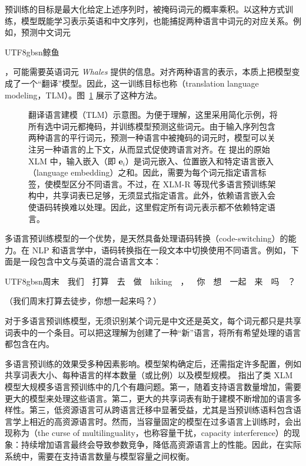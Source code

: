 \noindent 预训练的目标是最大化给定上述序列时，被掩码词元的概率乘积。以这种方式训练，模型既能学习表示英语和中文序列，也能捕捉两种语言中词元的对应关系。例如，预测中文词元\begin{CJK*}{UTF8}{gbsn}鲸鱼\end{CJK*}，可能需要英语词元 \textit{Whales} 提供的信息。对齐两种语言的表示，本质上把模型变成了一个“翻译”模型。因此，这一训练目标也称（translation language modeling，TLM）。图~\ref{fig:translation-language-modeling} 展示了这种方法。

\begin{figure}[!t]
\centering

\caption{翻译语言建模（TLM）示意图。为便于理解，这里采用简化示例，将所有选中词元都掩码，并训练模型预测这些词元。由于输入序列包含两种语言的平行词元，预测一种语言中被掩码的词元时，模型可以关注另一种语言的上下文，从而显式促使跨语言对齐。在 \citet{lample-conneau:2019cross} 提出的原始 XLM 中，输入嵌入（即 $\mathbf{e}_i$）是词元嵌入、位置嵌入和特定语言嵌入（language embedding）之和。因此，需要为每个词元指定语言标签，使模型区分不同语言。不过，在 XLM-R 等现代多语言预训练架构中，共享词表已足够，无须显式指定语言。此外，依赖语言嵌入会使语码转换难以处理。因此，这里假定所有词元表示都不依赖特定语言。}
\label{fig:translation-language-modeling}
\end{figure}

多语言预训练模型的一个优势，是天然具备处理语码转换（code-switching）的能力。在 NLP 和语言学中，语码转换指在一段文本中切换使用不同语言。例如，下面是一段包含中文与英语的混合语言文本：

\vspace{0.5em}
\begin{center}
\begin{CJK*}{UTF8}{gbsn}周末\ \ 我们\ \ 打算\ \ 去\ \ 做\ \ hiking\ \ ，\ \ 你\ \ 想\ \ 一起\ \ 来\ \ 吗\ \ ？\end{CJK*}

\small{（我们周末打算去徒步，你想一起来吗？）}
\end{center}
\vspace{0.5em}

\noindent 对于多语言预训练模型，无须识别某个词元是中文还是英文，每个词元都只是共享词表中的一个条目。可以把这理解为创建了一种“新”语言，将所有希望处理的语言都包含在内。

多语言预训练的效果受多种因素影响。模型架构确定后，还需指定许多配置，例如共享词表大小、每种语言的样本数量（或比例）以及模型规模。\citet{conneau-etal:2020unsupervised} 指出了类 XLM 模型大规模多语言预训练中的几个有趣问题。第一，随着支持语言数量增加，需要更大的模型来处理这些语言。第二，更大的共享词表有助于建模不断增加的语言多样性。第三，低资源语言可从跨语言迁移中显著受益，尤其是当预训练语料包含语言学上相近的高资源语言时。然而，当容量固定的模型在过多语言上训练时，会出现称为（the curse of multilinguality，也称容量干扰，capacity interference）的现象：持续增加语言最终会导致参数竞争，降低高资源语言上的性能。因此，在实际系统中，需要在支持语言数量与模型容量之间权衡。

